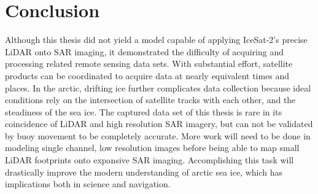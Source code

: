 \chapter{Conclusion}
\label{sec:Conclusion}

Although this thesis did not yield a model capable of applying IceSat-2's precise LiDAR onto SAR imaging, it demonstrated the difficulty of acquiring and processing related remote sensing data sets. With substantial effort, satellite products can be coordinated to acquire data at nearly equivalent times and places. In the arctic, drifting ice further complicates data collection because ideal conditions rely on the intersection of satellite tracks with each other, and the steadiness of the sea ice. The captured data set of this thesis is rare in its coincidence of LiDAR and high resolution SAR imagery, but can not be validated by buoy movement to be completely accurate. More work will need to be done in modeling single channel, low resolution images before being able to map small LiDAR footprints onto expansive SAR imaging. Accomplishing this task will drastically improve the modern understanding of arctic sea ice, which has implications both in science and navigation.